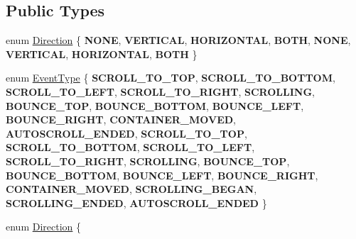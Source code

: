\subsection*{Public Types}
\begin{DoxyCompactItemize}
\item 
enum \hyperlink{classui_1_1ScrollView_aed2d778ae8098dcafe323b2beae8dd6b}{Direction} \{ \newline
{\bfseries N\+O\+NE}, 
{\bfseries V\+E\+R\+T\+I\+C\+AL}, 
{\bfseries H\+O\+R\+I\+Z\+O\+N\+T\+AL}, 
{\bfseries B\+O\+TH}, 
\newline
{\bfseries N\+O\+NE}, 
{\bfseries V\+E\+R\+T\+I\+C\+AL}, 
{\bfseries H\+O\+R\+I\+Z\+O\+N\+T\+AL}, 
{\bfseries B\+O\+TH}
 \}
\item 
enum \hyperlink{classui_1_1ScrollView_ac2a08f5665cbbfbff86fe7abdb6fbb02}{Event\+Type} \{ \newline
{\bfseries S\+C\+R\+O\+L\+L\+\_\+\+T\+O\+\_\+\+T\+OP}, 
{\bfseries S\+C\+R\+O\+L\+L\+\_\+\+T\+O\+\_\+\+B\+O\+T\+T\+OM}, 
{\bfseries S\+C\+R\+O\+L\+L\+\_\+\+T\+O\+\_\+\+L\+E\+FT}, 
{\bfseries S\+C\+R\+O\+L\+L\+\_\+\+T\+O\+\_\+\+R\+I\+G\+HT}, 
\newline
{\bfseries S\+C\+R\+O\+L\+L\+I\+NG}, 
{\bfseries B\+O\+U\+N\+C\+E\+\_\+\+T\+OP}, 
{\bfseries B\+O\+U\+N\+C\+E\+\_\+\+B\+O\+T\+T\+OM}, 
{\bfseries B\+O\+U\+N\+C\+E\+\_\+\+L\+E\+FT}, 
\newline
{\bfseries B\+O\+U\+N\+C\+E\+\_\+\+R\+I\+G\+HT}, 
{\bfseries C\+O\+N\+T\+A\+I\+N\+E\+R\+\_\+\+M\+O\+V\+ED}, 
{\bfseries A\+U\+T\+O\+S\+C\+R\+O\+L\+L\+\_\+\+E\+N\+D\+ED}, 
{\bfseries S\+C\+R\+O\+L\+L\+\_\+\+T\+O\+\_\+\+T\+OP}, 
\newline
{\bfseries S\+C\+R\+O\+L\+L\+\_\+\+T\+O\+\_\+\+B\+O\+T\+T\+OM}, 
{\bfseries S\+C\+R\+O\+L\+L\+\_\+\+T\+O\+\_\+\+L\+E\+FT}, 
{\bfseries S\+C\+R\+O\+L\+L\+\_\+\+T\+O\+\_\+\+R\+I\+G\+HT}, 
{\bfseries S\+C\+R\+O\+L\+L\+I\+NG}, 
\newline
{\bfseries B\+O\+U\+N\+C\+E\+\_\+\+T\+OP}, 
{\bfseries B\+O\+U\+N\+C\+E\+\_\+\+B\+O\+T\+T\+OM}, 
{\bfseries B\+O\+U\+N\+C\+E\+\_\+\+L\+E\+FT}, 
{\bfseries B\+O\+U\+N\+C\+E\+\_\+\+R\+I\+G\+HT}, 
\newline
{\bfseries C\+O\+N\+T\+A\+I\+N\+E\+R\+\_\+\+M\+O\+V\+ED}, 
{\bfseries S\+C\+R\+O\+L\+L\+I\+N\+G\+\_\+\+B\+E\+G\+AN}, 
{\bfseries S\+C\+R\+O\+L\+L\+I\+N\+G\+\_\+\+E\+N\+D\+ED}, 
{\bfseries A\+U\+T\+O\+S\+C\+R\+O\+L\+L\+\_\+\+E\+N\+D\+ED}
 \}
\item 
enum \hyperlink{classui_1_1ScrollView_aed2d778ae8098dcafe323b2beae8dd6b}{Direction} \{ \newline

\end{DoxyCompactItemize}
